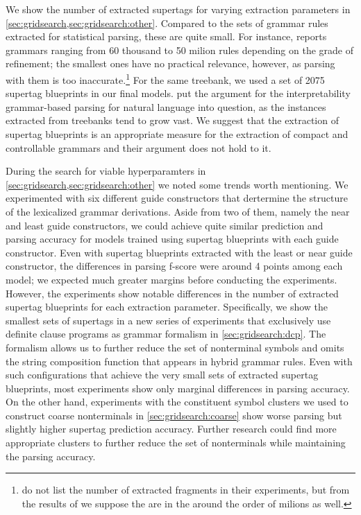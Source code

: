 \documentclass[../document.tex]{subfiles}
\begin{document}
    We show the number of extracted supertags for varying extraction parameters in \cref{sec:gridsearch,sec:gridsearch:other}.
    Compared to the sets of grammar rules extracted for statistical parsing, these are quite small.
    For instance, \citet[cf.\@ Figure 7.4]{Geb20} reports grammars ranging from 60 thousand to 50 milion rules depending on the grade of refinement; the smallest ones have no practical relevance, however, as parsing with them is too inaccurate.\footnote{
        \citet{CraSchBod16} do not list the number of extracted fragments in their experiments, but from the results of \citet{San11} we suppose the are in the around the order of milions as well.
    }
    For the same treebank, we used a set of 2075 supertag blueprints in our final models.
    \citet{Geb20} put the argument for the interpretability grammar-based parsing for natural language into question, as the instances extracted from treebanks tend to grow vast.
    We suggest that the extraction of supertag blueprints is an appropriate measure for the extraction of compact and controllable grammars and their argument does not hold to it.

    During the search for viable hyperparamters in \cref{sec:gridsearch,sec:gridsearch:other} we noted some trends worth mentioning.
    We experimented with six different guide constructors that dertermine the structure of the lexicalized grammar derivations. Aside from two of them, namely the near and least guide constructors, we could achieve quite similar prediction and parsing accuracy for models trained using supertag blueprints with each guide constructor.
    Even with supertag blueprints extracted with the least or near guide constructor, the differences in parsing f-score were around 4 points among each model; we expected much greater margins before conducting the experiments.
    However, the experiments show notable differences in the number of extracted supertag blueprints for each extraction parameter.
    Specifically, we show the smallest sets of supertags in a new series of experiments that exclusively use definite clause programs as grammar formalism in \cref{sec:gridsearch:dcp}.
    The formalism allows us to further reduce the set of nonterminal symbols and omits the string composition function that appears in hybrid grammar rules.
    Even with such configurations that achieve the very small sets of extracted supertag blueprints, most experiments show only marginal differences in parsing accuracy.
    On the other hand, experiments with the constituent symbol clusters we used to construct coarse nonterminals in \cref{sec:gridsearch:coarse} show worse parsing but slightly higher supertag prediction accuracy.
    Further research could find more appropriate clusters to further reduce the set of nonterminals while maintaining the parsing accuracy.
\end{document}
